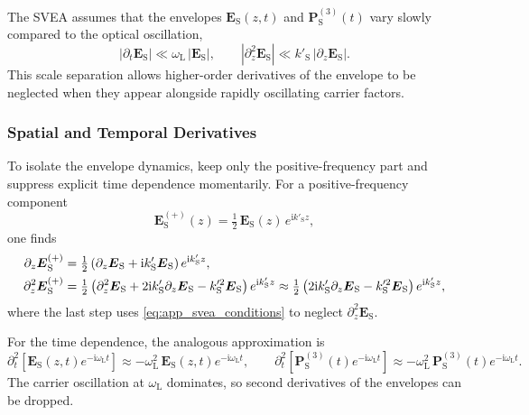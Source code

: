 The SVEA assumes that the envelopes $\boldsymbol{E}_{\mathrm{S}}(z,t)$ and $\boldsymbol{P}_{\mathrm{S}}^{(3)}(t)$ vary slowly compared to the optical oscillation,
\begin{equation}
	\left|\partial_t \boldsymbol{E}_{\mathrm{S}}\right| \ll \omega_{\mathrm{L}}\,\left|\boldsymbol{E}_{\mathrm{S}}\right|,
	\qquad
	\left|\partial_z^2 \boldsymbol{E}_{\mathrm{S}}\right| \ll k'_{\mathrm{S}}\,\left|\partial_z \boldsymbol{E}_{\mathrm{S}}\right|.
	\label{eq:app_svea_conditions}
\end{equation}
This scale separation allows higher-order derivatives of the envelope to be neglected when they appear alongside rapidly oscillating carrier factors.

\subsubsection{Spatial and Temporal Derivatives}
\label{app:subsubsec:spatial_temporal}
To isolate the envelope dynamics, keep only the positive-frequency part and suppress explicit time dependence momentarily. For a positive-frequency component
\begin{equation*}
	\boldsymbol{E}_{\mathrm{S}}^{(+)}(z) = \tfrac{1}{2}\,\boldsymbol{E}_{\mathrm{S}}(z)\,e^{\mathrm{i} k'_{\mathrm{S}} z},
\end{equation*}
one finds
\begin{align}
	\partial_z \boldsymbol{E}_{\mathrm{S}}^{(+)}
	 & = \tfrac{1}{2}\left(\partial_z \boldsymbol{E}_{\mathrm{S}} + \mathrm{i} k'_{\mathrm{S}}\boldsymbol{E}_{\mathrm{S}}\right)e^{\mathrm{i} k'_{\mathrm{S}} z},
	\notag\\
	\partial_z^2 \boldsymbol{E}_{\mathrm{S}}^{(+)}
	 & = \tfrac{1}{2}\left(\partial_z^2 \boldsymbol{E}_{\mathrm{S}} + 2 \mathrm{i} k'_{\mathrm{S}}\partial_z \boldsymbol{E}_{\mathrm{S}} - k_{\mathrm{S}}'^2\boldsymbol{E}_{\mathrm{S}}\right)e^{\mathrm{i} k'_{\mathrm{S}} z}
	\approx \tfrac{1}{2}\left(2 \mathrm{i} k'_{\mathrm{S}}\partial_z \boldsymbol{E}_{\mathrm{S}} - k_{\mathrm{S}}'^2\boldsymbol{E}_{\mathrm{S}}\right)e^{\mathrm{i} k'_{\mathrm{S}} z},
	\label{eq:app_second_derivative_svea}
\end{align}
where the last step uses \autoref{eq:app_svea_conditions} to neglect $\partial_z^2\boldsymbol{E}_{\mathrm{S}}$.

For the time dependence, the analogous approximation is
\begin{equation}
	\partial_t^2\!\left[\boldsymbol{E}_{\mathrm{S}}(z,t)e^{-\mathrm{i}\omega_{\mathrm{L}} t}\right] \approx -\omega_{\mathrm{L}}^2\,\boldsymbol{E}_{\mathrm{S}}(z,t)e^{-\mathrm{i}\omega_{\mathrm{L}} t},
	\qquad
	\partial_t^2\!\left[\boldsymbol{P}_{\mathrm{S}}^{(3)}(t)e^{-\mathrm{i}\omega_{\mathrm{L}} t}\right] \approx -\omega_{\mathrm{L}}^2\,\boldsymbol{P}_{\mathrm{S}}^{(3)}(t)e^{-\mathrm{i}\omega_{\mathrm{L}} t}.
	\label{eq:app_time_derivatives_svea}
\end{equation}
The carrier oscillation at $\omega_{\mathrm{L}}$ dominates, so second derivatives of the envelopes can be dropped.

